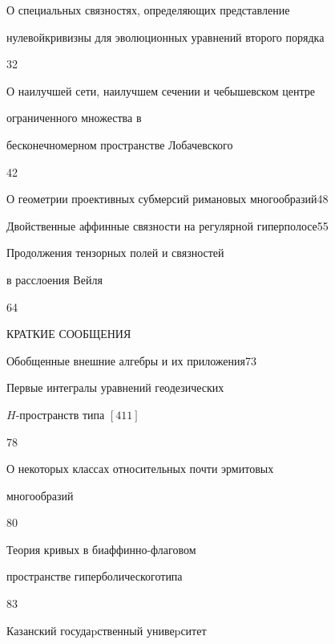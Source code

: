 {О специальных связностях, определяющих представление 


нулевой\newline кривизны для эволюционных уравнений второго порядка}{32}




{О наилучшей сети, наилучшем сечении и чебышевском центре\newline


ограниченного множества в


бесконечномерном пространстве Лобачевского}{42}




{О геометрии проективных субмерсий римановых многообразий}{48}




{Двойственные аффинные связности на регулярной гиперполосе}{55}




{Продолжения тензорных полей и связностей 


в расслоения Вейля}{64}





\bigskip


\par


\centerline{КРАТКИЕ СООБЩЕНИЯ}


\bigskip







{Обобщенные внешние алгебры и их приложения}{73}




{Первые интегралы уравнений геодезических  


$H$-пространств типа $[411]$}{78}




{О некоторых классах относительных почти эрмитовых 


многообразий}{80}




{Теория кривых в биаффинно-флаговом  


пространстве гиперболического\newline типа}{83}








\vfill


\noindent\raisebox{2pt}{\copyright} Казанский госудаpственный унивеpситет





